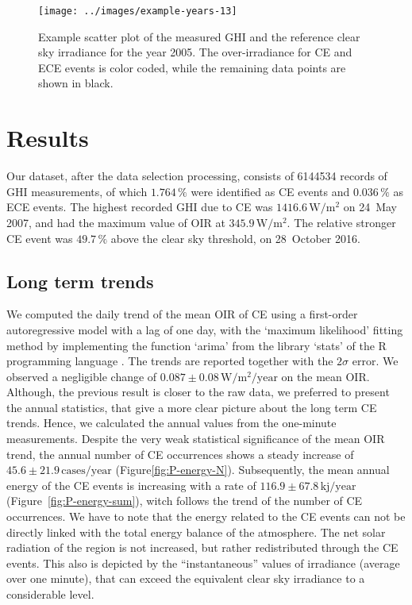 \documentclass[preprint, 5p,
authoryear]{elsarticle} %
\begin{document}
\begin{figure}[H]

{\centering \texttt{[image: ../images/example-years-13]} 

}

\caption{Example scatter plot of the measured GHI and the reference clear sky irradiance for the year 2005. The over-irradiance for CE and ECE events is color coded, while the remaining data points are shown in black.}\label{fig:example-year}
\end{figure}

\hypertarget{results}{%
\section{Results}\label{results}}

Our dataset, after the data selection processing, consists of 6144534
records of GHI measurements, of which \(1.764\,\%\) were identified as
CE events and \(0.036\,\%\) as ECE events. The highest recorded GHI due
to CE was \(1416.6\,\text{W}/\text{m}^2\) on 24~May 2007, and had the
maximum value of OIR at \(345.9\,\text{W}/\text{m}^2\). The relative
stronger CE event was \(49.7\,\%\) above the clear sky threshold, on
28~October 2016.

\hypertarget{long-term-trends}{%
\subsection{Long term trends}\label{long-term-trends}}

We computed the daily trend of the mean OIR of CE using a first-order
autoregressive model with a lag of one day, with the `maximum
likelihood' fitting method \citep{Gardner1980, Jones1980} by
implementing the function `arima' from the library `stats' of the R
programming language \citep{RCT2023}. The trends are reported together
with the \(2\sigma\) error. We observed a negligible change of
\(0.087\pm 0.08\,\text{W}/\text{m}^2/\text{year}\) on the mean OIR.
Although, the previous result is closer to the raw data, we preferred to
present the annual statistics, that give a more clear picture about the
long term CE trends. Hence, we calculated the annual values from the
one-minute measurements. Despite the very weak statistical significance
of the mean OIR trend, the annual number of CE occurrences shows a
steady increase of \(45.6\pm 21.9\,\text{cases}/\text{year}\)
(Figure\nobreakspace{}\ref{fig:P-energy-N}). Subsequently, the mean
annual energy of the CE events is increasing with a rate of
\(116.9\pm 67.8\,\text{kj}/\text{year}\)
(Figure~\ref{fig:P-energy-sum}), witch follows the trend of the number
of CE occurrences. We have to note that the energy related to the CE
events can not be directly linked with the total energy balance of the
atmosphere. The net solar radiation of the region is not increased, but
rather redistributed through the CE events. This also is depicted by the
``instantaneous'' values of irradiance (average over one minute), that
can exceed the equivalent clear sky irradiance to a considerable level.
\end{document}

